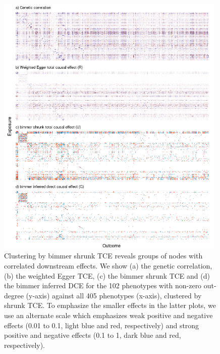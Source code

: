 \documentclass{article}
\begin{document}
\begin{figure}
\includegraphics[width=0.98\textwidth]{figures/figure5.png}
\caption{Clustering by bimmer shrunk TCE reveals groups of nodes with correlated downstream effects.
We show (a) the genetic correlation, (b) the weighted Egger TCE, (c) the bimmer shrunk
TCE and (d) the bimmer inferred DCE for the 102 phenotypes with non-zero out-degree (y-axis)
against all 405 phenotypes (x-axis), clustered by shrunk TCE. To emphasize the smaller effects
in the latter plots, we use an alternate scale which emphasizes weak positive and negative effects
(0.01 to 0.1, light blue and red, respectively) and strong positive and negative effects
(0.1 to 1, dark blue and red, respectively).}
\label{figure5}
\end{figure}
\end{document}
